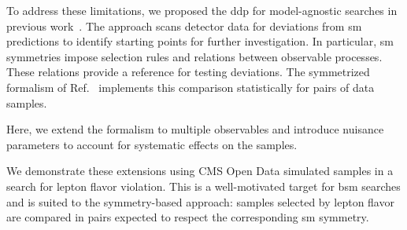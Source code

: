 \documentclass[paper/ddppaper2.tex]{subfiles}
\begin{document}
To address these limitations, we proposed the \gls{ddp} for model-agnostic searches in previous work~\cite{Volkovich_2022_DDP, Birman_2022_Symmetries, LastDDPPaper}. The approach scans detector data for deviations from \gls{sm} predictions to identify starting points for further investigation. In particular, \gls{sm} symmetries impose selection rules and relations between observable processes. These relations provide a reference for testing deviations. The symmetrized formalism of Ref.~\cite{LastDDPPaper} implements this comparison statistically for pairs of data samples.

Here, we extend the formalism to multiple observables and introduce nuisance parameters to account for systematic effects on the samples.

We demonstrate these extensions using CMS Open Data simulated samples in a search for lepton flavor violation. This is a well-motivated target for \gls{bsm} searches and is suited to the symmetry-based approach: samples selected by lepton flavor are compared in pairs expected to respect the corresponding \gls{sm} symmetry.
\ifdefined\paper
    \studyboundary
\fi
\end{document}
